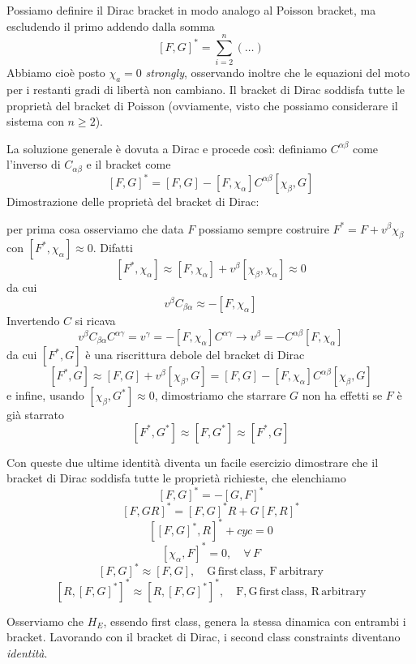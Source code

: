\documentclass[a4paper, 11pt]{article}
\begin{document}
	Possiamo definire il Dirac bracket in modo analogo al Poisson bracket, ma escludendo il primo addendo dalla somma
	\[ [F,G]^* = \sum_{i=2}^{n} (\dots) \]
	Abbiamo cioè posto $\chi_a=0$ \emph{strongly}, osservando inoltre che le equazioni del moto per i restanti gradi di libertà non cambiano. Il bracket di Dirac soddisfa tutte le proprietà del bracket di Poisson (ovviamente, visto che possiamo considerare il sistema con $n\ge 2$).
	
	\vspace{5mm}
	La soluzione generale è dovuta a Dirac e procede così: definiamo $C^{\alpha\beta}$ come l'inverso di $C_{\alpha\beta}$ e il bracket come
	\begin{equation}
		\label{DiracB}
		[F,G]^* = [F, G] - [F, \chi_\alpha] C^{\alpha\beta} [\chi_\beta, G]
	\end{equation}
	Dimostrazione delle proprietà del bracket di Dirac:
	
	per prima cosa osserviamo che data $F$ possiamo sempre costruire $F^*=F+v^\beta\chi_\beta$ con $[F^*, \chi_\alpha] \approx 0$. Difatti
	\[ [F^*, \chi_\alpha] \approx [F, \chi_\alpha] + v^\beta [\chi_\beta, \chi_\alpha] \approx 0 \]
	da cui
	\[ v^\beta C_{\beta\alpha} \approx - [F, \chi_\alpha] \]
	Invertendo $C$ si ricava
	\[ v^\beta C_{\beta\alpha} C^{\alpha\gamma} = v^\gamma = -[F, \chi_\alpha] C^{\alpha\gamma}\rightarrow v^\beta = -C^{\alpha\beta} [F, \chi_\alpha] \]
	da cui $[F^*, G]$ è una riscrittura debole del bracket di Dirac
	\[ [F^*, G] \approx [F, G] + v^\beta [\chi_\beta, G] = [F, G] - [F,\chi_\alpha] C^{\alpha\beta} [\chi_\beta, G] \]
	e infine, usando $[\chi_\beta, G^*] \approx 0$, dimostriamo che starrare $G$ non ha effetti se $F$ è già starrato
	\[ [F^*, G^*] \approx [F, G^*] \approx [F^*, G] \]

	Con queste due ultime identità diventa un facile esercizio dimostrare che il bracket di Dirac soddisfa tutte le proprietà richieste, che elenchiamo
	\[ [F,G]^* = -[G, F]^* \]
	\[ [F, GR]^* = [F,G]^* R + G[F,R]^* \]
	\[ [[F,G]^*, R]^* + cyc = 0 \]
	\[ [\chi_\alpha, F]^* = 0,\quad \forall\,F \]
	\[ [F, G]^* \approx [F, G],\quad \mathrm{G\, first\, class,\, F\, arbitrary} \]
	\[ [R, [F, G]^*]^* \approx [R, [F, G]^*]^*,\quad \mathrm{F,G\, first\, class,\, R\, arbitrary} \]
	
	Osserviamo che $H_E$, essendo first class, genera la stessa dinamica con entrambi i bracket.
	Lavorando con il bracket di Dirac, i second class constraints diventano \emph{identità}.
	
\end{document}
